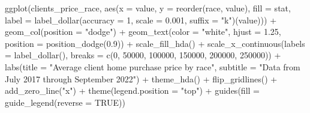 \documentclass[
  letterpaper,
  DIV=11,
  numbers=noendperiod]{scrartcl}
\newenvironment{Shaded}{\begin{snugshade}}{\end{snugshade}}
\newcommand{\AttributeTok}[1]{\textcolor[rgb]{0.40,0.45,0.13}{#1}}
\newcommand{\ConstantTok}[1]{\textcolor[rgb]{0.56,0.35,0.01}{#1}}
\newcommand{\DecValTok}[1]{\textcolor[rgb]{0.68,0.00,0.00}{#1}}
\newcommand{\FloatTok}[1]{\textcolor[rgb]{0.68,0.00,0.00}{#1}}
\newcommand{\FunctionTok}[1]{\textcolor[rgb]{0.28,0.35,0.67}{#1}}
\newcommand{\NormalTok}[1]{\textcolor[rgb]{0.00,0.23,0.31}{#1}}
\newcommand{\SpecialCharTok}[1]{\textcolor[rgb]{0.37,0.37,0.37}{#1}}
\newcommand{\StringTok}[1]{\textcolor[rgb]{0.13,0.47,0.30}{#1}}
\begin{document}
\begin{Shaded}
\begin{Highlighting}[]
\FunctionTok{ggplot}\NormalTok{(clients\_price\_race, }\FunctionTok{aes}\NormalTok{(}\AttributeTok{x =}\NormalTok{ value, }\AttributeTok{y =} \FunctionTok{reorder}\NormalTok{(race, value),}
                               \AttributeTok{fill =}\NormalTok{ stat,}
                               \AttributeTok{label =} \FunctionTok{label\_dollar}\NormalTok{(}\AttributeTok{accuracy =} \DecValTok{1}\NormalTok{, }\AttributeTok{scale =} \FloatTok{0.001}\NormalTok{, }\AttributeTok{suffix =} \StringTok{"k"}\NormalTok{)(value))) }\SpecialCharTok{+}
  \FunctionTok{geom\_col}\NormalTok{(}\AttributeTok{position =} \StringTok{"dodge"}\NormalTok{) }\SpecialCharTok{+}
  \FunctionTok{geom\_text}\NormalTok{(}\AttributeTok{color =} \StringTok{"white"}\NormalTok{, }\AttributeTok{hjust =} \FloatTok{1.25}\NormalTok{, }\AttributeTok{position =} \FunctionTok{position\_dodge}\NormalTok{(}\FloatTok{0.9}\NormalTok{)) }\SpecialCharTok{+}
  \FunctionTok{scale\_fill\_hda}\NormalTok{() }\SpecialCharTok{+}
  \FunctionTok{scale\_x\_continuous}\NormalTok{(}\AttributeTok{labels =} \FunctionTok{label\_dollar}\NormalTok{(),}
                     \AttributeTok{breaks =} \FunctionTok{c}\NormalTok{(}\DecValTok{0}\NormalTok{, }\DecValTok{50000}\NormalTok{, }\DecValTok{100000}\NormalTok{, }\DecValTok{150000}\NormalTok{, }\DecValTok{200000}\NormalTok{, }\DecValTok{250000}\NormalTok{)) }\SpecialCharTok{+}
  \FunctionTok{labs}\NormalTok{(}\AttributeTok{title =} \StringTok{"Average client home purchase price by race"}\NormalTok{,}
       \AttributeTok{subtitle =} \StringTok{"Data from July 2017 through September 2022"}\NormalTok{) }\SpecialCharTok{+}
  \FunctionTok{theme\_hda}\NormalTok{() }\SpecialCharTok{+}
  \FunctionTok{flip\_gridlines}\NormalTok{() }\SpecialCharTok{+}
  \FunctionTok{add\_zero\_line}\NormalTok{(}\StringTok{"x"}\NormalTok{) }\SpecialCharTok{+}
  \FunctionTok{theme}\NormalTok{(}\AttributeTok{legend.position =} \StringTok{"top"}\NormalTok{) }\SpecialCharTok{+}
  \FunctionTok{guides}\NormalTok{(}\AttributeTok{fill =} \FunctionTok{guide\_legend}\NormalTok{(}\AttributeTok{reverse =} \ConstantTok{TRUE}\NormalTok{))}
\end{Highlighting}
\end{Shaded}
\end{document}
